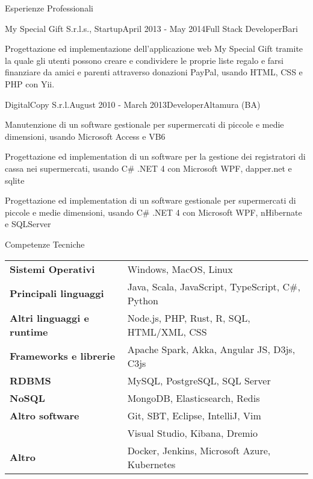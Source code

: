 \documentclass{resume} %
\begin{document}
\begin{rSection}{Esperienze Professionali}

\begin{rSubsection}{My Special Gift S.r.l.s., Startup}{April 2013 - May 2014}{Full Stack Developer}{Bari}
\item Progettazione ed implementazione dell'applicazione web My Special Gift tramite la quale gli utenti possono creare e condividere le proprie liste regalo e farsi finanziare da amici e parenti attraverso donazioni PayPal, usando HTML, CSS e PHP con Yii.
\end{rSubsection}


\begin{rSubsection}{DigitalCopy S.r.l.}{August 2010 - March 2013}{Developer}{Altamura (BA)}
\item Manutenzione di un software gestionale per supermercati di piccole e medie dimensioni, usando Microsoft Access e VB6
\item Progettazione ed implementation di un software per la gestione dei registratori di cassa nei supermercati, usando C\# .NET 4 con Microsoft WPF, dapper.net e sqlite
\item Progettazione ed implementation di un software gestionale per supermercati di piccole e medie dimensioni, usando C\# .NET 4 con Microsoft WPF, nHibernate e SQLServer
\end{rSubsection}

\end{rSection}


\begin{rSection}{Competenze Tecniche}

\begin{tabular}{ @{} >{\bfseries}l @{\hspace{6ex}} l }
Sistemi Operativi & Windows, MacOS, Linux \\
Principali linguaggi & Java, Scala, JavaScript, TypeScript, C\#, Python \\
Altri linguaggi e runtime & Node.js, PHP, Rust, R, SQL, HTML/XML, CSS \\
Frameworks e librerie & Apache Spark, Akka, Angular JS, D3js, C3js \\
RDBMS & MySQL, PostgreSQL, SQL Server \\
NoSQL & MongoDB, Elasticsearch, Redis \\
Altro software & Git, SBT, Eclipse, IntelliJ, Vim \\
& Visual Studio, Kibana, Dremio \\
Altro & Docker, Jenkins, Microsoft Azure, Kubernetes \\
\end{tabular}

\end{rSection}
\end{document}
